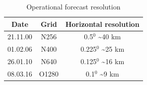 \begin{table}%
	\caption{Operational forecast resolution}\label{t_ecmwf2}
	\begin{tabular}{ ccc }
		\hline\hline
		Date & Grid & Horizontal resolution \\
		\hline\hline
		21.11.00 & N256 & 0.5$^0$ \textasciitilde{40} km \\ %
		01.02.06 & N400 & 0.225$^0$ \textasciitilde{25} km \\ %
		26.01.10 & N640 & 0.125$^0$ \textasciitilde{16} km \\ %
		08.03.16 & O1280 & 0.1$^0$ \textasciitilde{9} km \\ %
		\hline
	\end{tabular}
\end{table}

